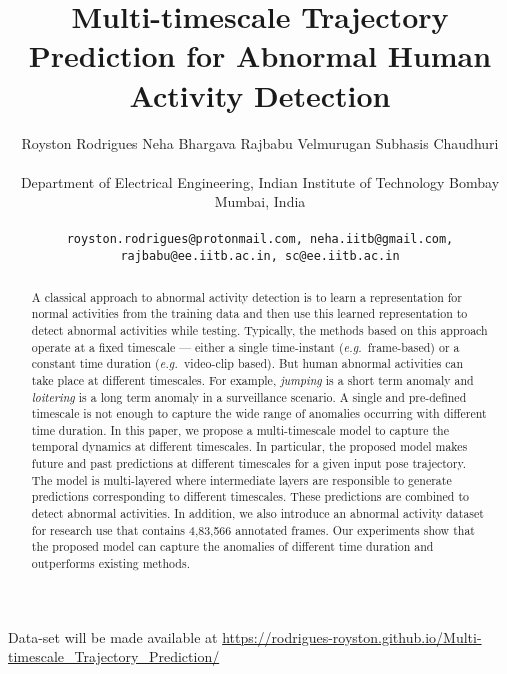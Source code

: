 \documentclass[conference]{IEEEtran}
\def\eg{\emph{e.g.~}}
\begin{document}
\title{\vspace{1cm}Multi-timescale Trajectory Prediction for Abnormal Human Activity Detection}

\author{Royston Rodrigues \hspace{2cm} Neha Bhargava \hspace{2cm} Rajbabu Velmurugan \hspace{2cm} Subhasis Chaudhuri  \\\\
Department of Electrical Engineering, Indian Institute of Technology Bombay\\
Mumbai, India\\\\

{\tt\small royston.rodrigues@protonmail.com, neha.iitb@gmail.com, rajbabu@ee.iitb.ac.in, sc@ee.iitb.ac.in}
}

\maketitle



\begin{abstract}
   A classical approach to abnormal activity detection is to learn a representation for normal activities from the training data and then use this learned representation to detect abnormal activities while testing. Typically, the methods based on this approach operate at a fixed timescale {---} either a single time-instant (\eg frame-based) or a constant time duration (\eg video-clip based). But human abnormal activities can take place at different timescales. For example, \textit{jumping} is a short term anomaly and \textit{loitering} is a long term anomaly in a surveillance scenario. A single and pre-defined timescale is not enough to capture the wide range of anomalies occurring with different time duration. In this paper, we propose a multi-timescale model to capture the temporal dynamics at different timescales. In particular, the proposed model makes future and past predictions at different timescales for a given input pose trajectory. The model is multi-layered where intermediate layers are responsible to generate predictions corresponding to different timescales. These predictions are combined to detect abnormal activities. In addition, we also introduce an abnormal activity dataset for research use that contains 4,83,566 annotated frames. Our experiments show that the proposed model can capture the anomalies of different time duration and outperforms existing methods.
   \end{abstract}
   Data-set will be made available at \url{https://rodrigues-royston.github.io/Multi-timescale\_Trajectory\_Prediction/}
\end{document}
